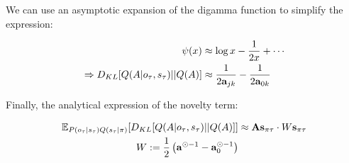 \documentclass{article}
\newcommand{\E}{\mathbb E}
\begin{document}
We can use an asymptotic expansion of the digamma function to simplify the expression:

\begin{equation}
    \begin{split}
        \psi(x) &\approx \log x -\frac{1}{2x}+\cdots \\
        \Rightarrow D_{KL}[Q(A|o_\tau, s_\tau) || Q(A)] &\approx \frac{1}{2\bold a_{jk}}-\frac{1}{2\bold a_{0k}}
    \end{split}
\end{equation}

Finally, the analytical expression of the novelty term:

\begin{equation}
\begin{split}
    \E_{P(o_\tau |s_\tau)Q(s_\tau|\pi)}[D_{KL}[Q(A|o_\tau, s_\tau) || Q(A)]] &\approx \bold A \bold s_{\pi \tau}\cdot  W \bold s_{\pi\tau}\\ 
    W :=\frac{1}{2}\left( \bold a^{\odot -1}-\bold a_0^{\odot -1} \right)&
\end{split}
\end{equation}






\end{document}
